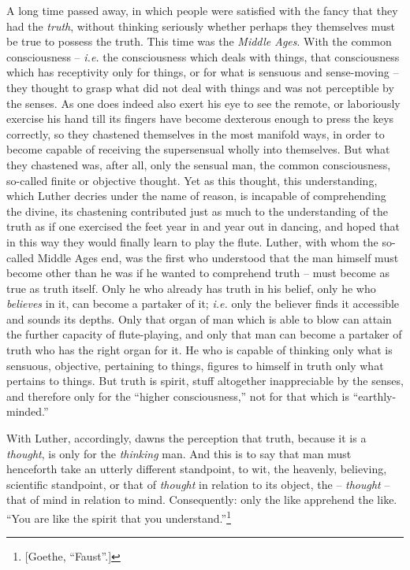 A long time passed away, in which people were satisfied with the fancy that 
they had the \textit{truth}, without thinking seriously whether perhaps they 
themselves must be true to possess the truth. This time was the \textit{Middle 
Ages}. With the common consciousness -- \textit{i.e.} the consciousness which 
deals with things, that consciousness which has receptivity only for things, 
or for what is sensuous and sense-moving -- they thought to grasp what did not 
deal with things and was not perceptible by the senses. As one does indeed 
also exert his eye to see the remote, or laboriously exercise his hand till 
its fingers have become dexterous enough to press the keys correctly, so they 
chastened themselves in the most manifold ways, in order to become capable of 
receiving the supersensual wholly into themselves. But what they chastened 
was, after all, only the sensual man, the common consciousness, so-called 
finite or objective thought. Yet as this thought, this understanding, which 
Luther decries under the name of reason, is incapable of comprehending the 
divine, its chastening contributed just as much to the understanding of the 
truth as if one exercised the feet year in and year out in dancing, and hoped 
that in this way they would finally learn to play the flute. Luther, with whom 
the so-called Middle Ages end, was the first who understood that the man 
himself must become other than he was if he wanted to comprehend truth -- must 
become as true as truth itself. Only he who already has truth in his belief, 
only he who \textit{believes} in it, can become a partaker of it; 
\textit{i.e.} only the believer finds it accessible and sounds its depths. 
Only that organ of man which is able to blow can attain the further capacity 
of flute-playing, and only that man can become a partaker of truth who has the 
right organ for it. He who is capable of thinking only what is sensuous, 
objective, pertaining to things, figures to himself in truth only what 
pertains to things. But truth is spirit, stuff altogether inappreciable by the 
senses, and therefore only for the ``higher consciousness,'' not for that 
which is ``earthly-minded.''

With Luther, accordingly, dawns the perception that truth, because it is a 
\textit{thought}, is only for the \textit{thinking} man. And this is to say 
that man must henceforth take an utterly different standpoint, to wit, the 
heavenly, believing, scientific standpoint, or that of \textit{thought} in 
relation to its object, the -- \textit{thought} -- that of mind in relation to 
mind. Consequently: only the like apprehend the like. ``You are like the 
spirit that you understand.''\footnote{[Goethe, ``Faust''.]}

